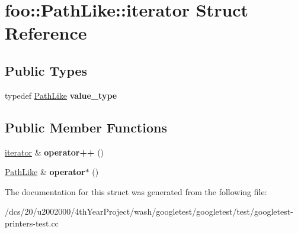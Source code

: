 \hypertarget{structfoo_1_1PathLike_1_1iterator}{}\section{foo\+:\+:Path\+Like\+:\+:iterator Struct Reference}
\label{structfoo_1_1PathLike_1_1iterator}
\subsection*{Public Types}
\begin{DoxyCompactItemize}
\item 
\mbox{\label{structfoo_1_1PathLike_1_1iterator_a797c204878a09e04b23cfe6b48ac7016}} 
typedef \mbox{\hyperlink{classfoo_1_1PathLike}{Path\+Like}} {\bfseries value\+\_\+type}
\end{DoxyCompactItemize}
\subsection*{Public Member Functions}
\begin{DoxyCompactItemize}
\item 
\mbox{\label{structfoo_1_1PathLike_1_1iterator_a35946d5efe98fa787944ec623dad0cd8}} 
\mbox{\hyperlink{structfoo_1_1PathLike_1_1iterator}{iterator}} \& {\bfseries operator++} ()
\item 
\mbox{\label{structfoo_1_1PathLike_1_1iterator_ae4b2de86a3ab63b77994cbd4931db735}} 
\mbox{\hyperlink{classfoo_1_1PathLike}{Path\+Like}} \& {\bfseries operator$\ast$} ()
\end{DoxyCompactItemize}


The documentation for this struct was generated from the following file\+:\begin{DoxyCompactItemize}
\item 
/dcs/20/u2002000/4th\+Year\+Project/wash/googletest/googletest/test/googletest-\/printers-\/test.\+cc\end{DoxyCompactItemize}
